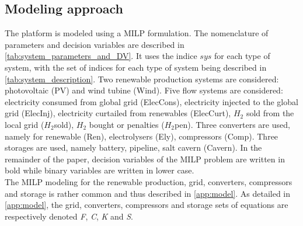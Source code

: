 \subsection{Modeling approach}
\label{Models}

\begin{frame}
    The platform is modeled using a MILP formulation. The nomenclature of parameters and decision variables are described in \autoref{tab:system_parameters_and_DV}.
    It uses the indice $sys$ for each type of system, with the set of indices for each type of system being described in \autoref{tab:system_description}.
    Two renewable production systems are considered: photovoltaic (PV) and wind tubine (Wind). Five flow systems are considered: electricity consumed from global grid (ElecCons), electricity injected to the global grid (ElecInj), electricity curtailed from renewables (ElecCurt), $H_2$ sold from the local grid ($H_2$sold), $H_2$ bought or penalties ($H_2$pen).
    Three converters are used, namely for renewable (Ren), electrolysers (Ely), compressors (Comp). Three storages are used, namely battery, pipeline, salt cavern (Cavern). In the remainder of the paper, decision variables of the MILP problem are written in bold while binary variables are written in lower case.\\
    The MILP modeling for the renewable production, grid, converters, compressors and storage is rather common and thus described in \ref{app:model}. As detailed in \ref{app:model}, the grid, converters, compressors and storage sets of equations are respectively denoted \textit{F}, \textit{C}, \textit{K} and \textit{S}.
\end{frame}
